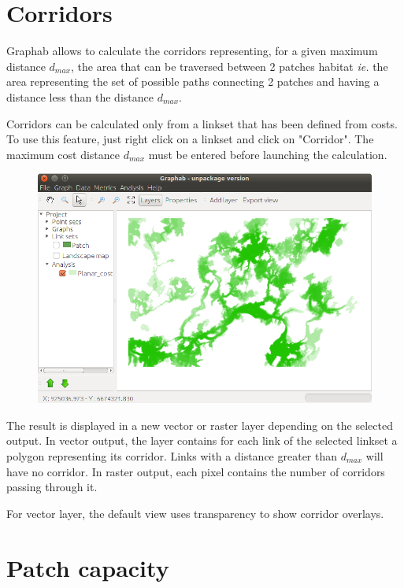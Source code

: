 \documentclass{article}
\begin{document}
\section{Corridors}

Graphab allows to calculate the corridors representing, for a given maximum distance $d_{max}$, the area that can be traversed between 2 patches habitat \textit{ie.} the area representing the set of possible paths connecting 2 patches and having a distance less than the distance $d_{max}$.

Corridors can be calculated only from a linkset that has been defined from costs. To use this feature, just right click on a linkset and click on "Corridor".
The maximum cost distance $d_{max}$ must be entered before launching the calculation.	

\begin{figure}[H]
	\includegraphics[scale=0.5]{img/manual-en_corridor.png} 
\end{figure}

The result is displayed in a new vector or raster layer depending on the selected output. In vector output, the layer contains for each link of the selected linkset a polygon representing its corridor. Links with a distance greater than $d_{max}$ will have no corridor.
In raster output, each pixel contains the number of corridors passing through it.

For vector layer, the default view uses transparency to show corridor overlays.


\section{Patch capacity}
\end{document}
